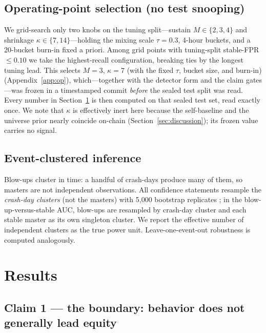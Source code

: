 \documentclass[11pt,a4paper]{article}
\begin{document}
\subsection{Operating-point selection (no test snooping)}
We grid-search only two knobs on the tuning split---sustain $M \in \{2,3,4\}$ and
shrinkage $\kappa \in \{7,14\}$---holding the mixing scale $\tau=0.3$, 4-hour buckets,
and a 20-bucket burn-in fixed a priori. Among grid points with tuning-split stable-FPR
$\leq 0.10$ we take the highest-recall configuration, breaking ties by the longest
tuning lead. This selects $M=3$, $\kappa=7$ (with the fixed $\tau$, bucket size, and
burn-in)
(Appendix~\ref{app:op}), which---together with the detector form and the claim
gates---was frozen in a timestamped commit \emph{before} the sealed test split was
read. Every number in Section~\ref{sec:results} is then computed on that sealed
test set, read exactly once. We note that $\kappa$ is effectively inert here
because the self-baseline and the universe prior nearly coincide on-chain
(Section~\ref{sec:discussion}); its frozen value carries no signal.

\subsection{Event-clustered inference}
Blow-ups cluster in time: a handful of crash-days produce many of them, so masters
are not independent observations. All confidence statements resample the
\emph{crash-day clusters} (not the masters) with 5{,}000 bootstrap replicates
\citep{efron1986bootstrap,cameron2008clusterboot}; in the blow-up-versus-stable AUC,
blow-ups are resampled by crash-day cluster and each stable master as its own
singleton cluster. We report the effective number of independent clusters as the true
power unit. Leave-one-event-out
robustness is computed analogously.

\section{Results}
\label{sec:results}

\subsection{Claim 1 --- the boundary: behavior does not generally lead equity}
\label{sec:boundary}
\end{document}
